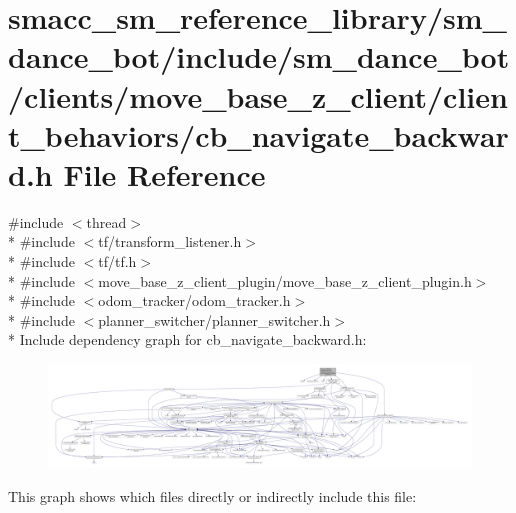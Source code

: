 \hypertarget{smacc__sm__reference__library_2sm__dance__bot_2include_2sm__dance__bot_2clients_2move__base__z__4f2aa30834ea1c7ed1eb80e835162070}{}\section{smacc\+\_\+sm\+\_\+reference\+\_\+library/sm\+\_\+dance\+\_\+bot/include/sm\+\_\+dance\+\_\+bot/clients/move\+\_\+base\+\_\+z\+\_\+client/client\+\_\+behaviors/cb\+\_\+navigate\+\_\+backward.h File Reference}
\label{smacc__sm__reference__library_2sm__dance__bot_2include_2sm__dance__bot_2clients_2move__base__z__4f2aa30834ea1c7ed1eb80e835162070}
{\ttfamily \#include $<$thread$>$}\\*
{\ttfamily \#include $<$tf/transform\+\_\+listener.\+h$>$}\\*
{\ttfamily \#include $<$tf/tf.\+h$>$}\\*
{\ttfamily \#include $<$move\+\_\+base\+\_\+z\+\_\+client\+\_\+plugin/move\+\_\+base\+\_\+z\+\_\+client\+\_\+plugin.\+h$>$}\\*
{\ttfamily \#include $<$odom\+\_\+tracker/odom\+\_\+tracker.\+h$>$}\\*
{\ttfamily \#include $<$planner\+\_\+switcher/planner\+\_\+switcher.\+h$>$}\\*
Include dependency graph for cb\+\_\+navigate\+\_\+backward.\+h\+:
\nopagebreak
\begin{figure}[H]
\begin{center}
\leavevmode
\includegraphics[width=350pt]{smacc__sm__reference__library_2sm__dance__bot_2include_2sm__dance__bot_2clients_2move__base__z__255f761ad86984bb69efd0a508759d43}
\end{center}
\end{figure}
This graph shows which files directly or indirectly include this file\+:
\nopagebreak
